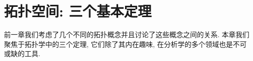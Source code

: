 \documentclass[../main.tex]{subfiles}
\begin{document}
\chapter{拓扑空间: 三个基本定理}\label{chapter:ch12-拓扑空间三定理}

前一章我们考虑了几个不同的拓扑概念并且讨论了这些概念之间的关系. 本章我们聚焦于拓扑学中的三个定理, 它们除了其内在趣味, 在分析学的多个领域也是不可或缺的工具.






\end{document}
